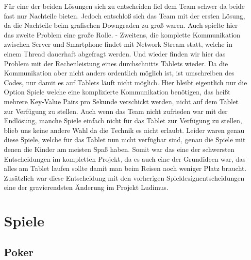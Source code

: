 Für eine der beiden Lösungen sich zu entscheiden fiel dem Team schwer da beide fast nur Nachteile bieten. Jedoch entschloß sich das Team mit der ersten Lösung, da die Nachteile beim grafischen Downgraden zu groß waren. Auch spielte hier das zweite Problem eine große Rolle.
\newline \newline \tab
- Zweitens, die komplette Kommunikation zwischen Server und Smartphone findet mit Network Stream statt, welche in einem Thread dauerhaft abgefragt werden. Und wieder finden wir hier das Problem mit der Rechenleistung eines durchschnitts Tablets wieder. Da die Kommunikation aber nicht anders ordentlich möglich ist, ist umschreiben des Codes, nur damit es auf Tablets läuft nicht möglich. Hier bleibt eigentlich nur die Option Spiele welche eine komplizierte Kommunikation benötigen, das heißt mehrere Key-Value Pairs pro Sekunde verschickt werden, nicht auf dem Tablet zur Verfügung zu stellen. 
\newline \newline
Auch wenn das Team nicht zufrieden war mit der Endlösung, manche Spiele einfach nicht für das Tablet zur Verfügung zu stellen, blieb uns keine andere Wahl da die Technik es nicht erlaubt. Leider waren genau diese Spiele, welche für das Tablet nun nicht verfügbar sind, genau die Spiele mit denen die Kinder am meisten Spaß haben. Somit war das eine der schwersten Entscheidungen im kompletten Projekt, da es auch eine der Grundideen war, das alles am Tablet laufen sollte damit man beim Reisen noch weniger Platz braucht. Zusätzlich war diese Entscheidung mit den vorherigen Spieldesignentscheidungen eine der gravierendsten Änderung im Projekt Ludimus.

\section{Spiele}
\subsection{Poker}
